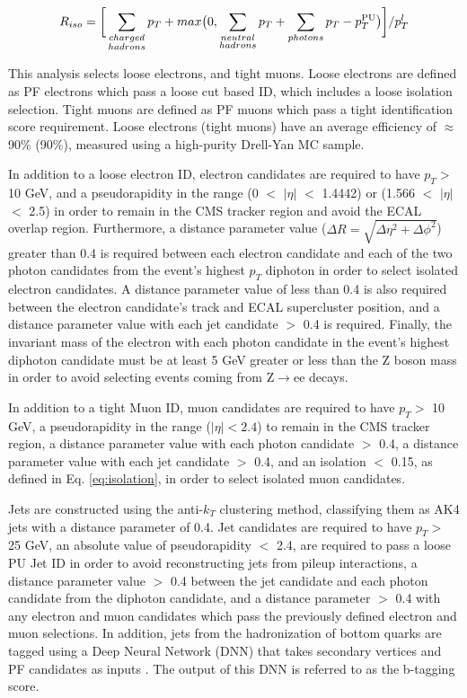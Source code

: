 \begin{equation} \label{eq:isolation}
    R_{iso} = \bigg[\sum_{\substack{charged\\hadrons}}p_T+max \big(0, \sum_{\substack{neutral\\hadrons}}p_T + \sum_{photons}p_T - p_T^{\textnormal{PU}} \big)\bigg]/p_T^{l}
\end{equation}

This analysis selects loose electrons, and tight muons. Loose electrons are defined as PF electrons which pass a loose cut based ID, which includes a loose isolation selection. Tight muons are defined 
as PF muons which pass a tight identification score requirement. Loose electrons (tight muons) have an average efficiency of $\approx$ 90\% (90\%), measured using
a high-purity Drell-Yan MC sample. 

In addition to a loose electron ID, electron candidates are required to have $p_{T} > $ 10 GeV, and a pseudorapidity in the range (0 $<$ $|\eta|$ $<$ 1.4442) or (1.566 $<$ $|\eta|$ $<$ 2.5) 
in order to remain in the CMS tracker region and avoid the ECAL overlap region. Furthermore, a distance parameter value ($\Delta R = \sqrt{\Delta\eta^{2} + \Delta\phi^{2}}$) greater than 
0.4 is required between each electron candidate and each of the two photon candidates from the event's highest $p_{T}$ diphoton in order to select isolated electron candidates. A distance parameter value 
of less than 0.4 is also required between the electron candidate's track and ECAL supercluster position, and a 
distance parameter value with each jet candidate $>$ 0.4 is required. Finally, the invariant mass of the electron with each photon candidate in the event's highest \pt diphoton 
candidate must be at least 5 GeV greater or less than the Z boson mass in order to avoid selecting events coming from Z$\rightarrow$ee decays. 

In addition to a tight Muon ID, muon candidates are required to have $p_{T} > $ 10 GeV, a pseudorapidity in the range ($|\eta| < 2.4$) to remain in the CMS tracker region, a distance parameter value with each photon candidate $>$ 0.4, a 
distance parameter value with each jet candidate $>$ 0.4, and an isolation $<$ 0.15, as defined in Eq. \ref{eq:isolation}, in order to select isolated muon candidates. 

Jets are constructed using the anti-$k_{T}$ clustering method, classifying them as AK4 jets with a distance parameter of 0.4. Jet candidates are 
required to have $p_{T} > $ 25 GeV, an absolute value of pseudorapidity $<$ 2.4, are required to pass a loose PU Jet ID in order to avoid reconstructing
jets from pileup interactions, a distance parameter value $>$ 0.4 between the jet 
candidate and each photon candidate from the diphoton candidate, and a distance parameter $>$ 0.4 with any electron and muon candidates which pass the previously defined 
electron and muon selections. In addition, jets from the hadronization of bottom quarks are tagged using a Deep Neural Network (DNN) that takes secondary vertices and PF 
candidates as inputs \cite{Sirunyan:2017ezt}. The output of this DNN is referred to as the b-tagging score.